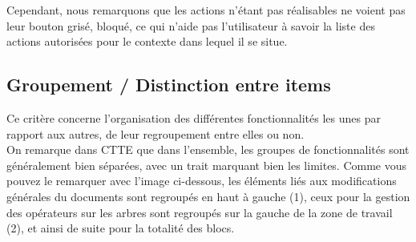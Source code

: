 \documentclass[12pt, a4paper]{article}
\begin{document}
Cependant, nous remarquons que les actions n'étant pas réalisables ne voient pas leur bouton grisé, bloqué, ce qui n'aide pas l'utilisateur à savoir la liste des actions autorisées pour le contexte dans lequel il se situe.
\newpage
\subsection{Groupement / Distinction entre items}
Ce critère concerne l'organisation des différentes fonctionnalités les unes par rapport aux autres, de leur regroupement entre elles ou non.\\


On remarque dans CTTE que dans l'ensemble, les groupes de fonctionnalités sont généralement bien séparées, avec un trait marquant bien les limites. Comme vous pouvez le remarquer avec l'image ci-dessous, les éléments liés aux modifications générales du documents sont regroupés en haut à gauche (1), ceux pour la gestion des opérateurs sur les arbres sont regroupés sur la gauche de la zone de travail (2), et ainsi de suite pour la totalité des blocs. 
\end{document}
